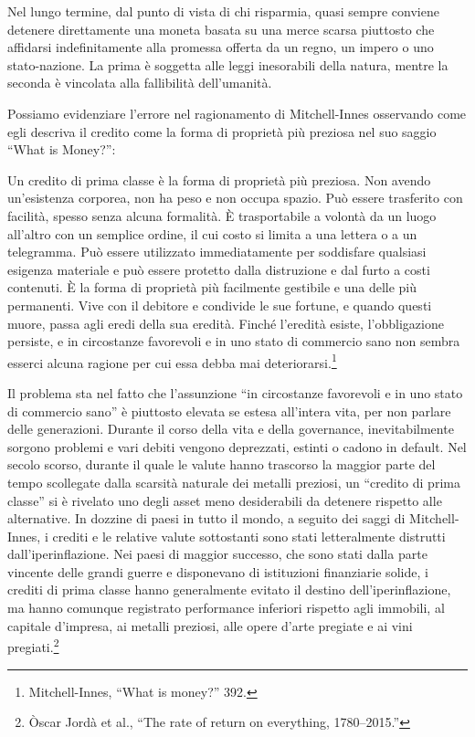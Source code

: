 \documentclass[
  a5paper,
  smalldemyvopaper,10pt,twoside,onecolumn,openright,extrafontsizes,hidelinks]{memoir}
\renewenvironment{quote}%
               {\list{}{\rightmargin=.6cm\leftmargin=.6cm}%
                \itshape \item[]}%
               {\endlist}
\begin{document}
Nel lungo termine, dal punto di vista di chi risparmia, quasi sempre
conviene detenere direttamente una moneta basata su una merce scarsa
piuttosto che affidarsi indefinitamente alla promessa offerta da un
regno, un impero o uno stato-nazione. La prima è soggetta alle leggi
inesorabili della natura, mentre la seconda è vincolata alla fallibilità
dell'umanità.

Possiamo evidenziare l'errore nel ragionamento di Mitchell-Innes
osservando come egli descriva il credito come la forma di proprietà più
preziosa nel suo saggio ``What is Money?'':

\begin{quote}
Un credito di prima classe è la forma di proprietà più preziosa. Non
avendo un'esistenza corporea, non ha peso e non occupa spazio. Può
essere trasferito con facilità, spesso senza alcuna formalità. È
trasportabile a volontà da un luogo all'altro con un semplice ordine, il
cui costo si limita a una lettera o a un telegramma. Può essere
utilizzato immediatamente per soddisfare qualsiasi esigenza materiale e
può essere protetto dalla distruzione e dal furto a costi contenuti. È
la forma di proprietà più facilmente gestibile e una delle più
permanenti. Vive con il debitore e condivide le sue fortune, e quando
questi muore, passa agli eredi della sua eredità. Finché l'eredità
esiste, l'obbligazione persiste, e in circostanze favorevoli e in uno
stato di commercio sano non sembra esserci alcuna ragione per cui essa
debba mai deteriorarsi.\footnote{Mitchell-Innes, ``What is money?'' 392.}
\end{quote}

Il problema sta nel fatto che l'assunzione ``in circostanze favorevoli e
in uno stato di commercio sano'' è piuttosto elevata se estesa
all'intera vita, per non parlare delle generazioni. Durante il corso
della vita e della governance, inevitabilmente sorgono problemi e vari
debiti vengono deprezzati, estinti o cadono in default. Nel secolo
scorso, durante il quale le valute hanno trascorso la maggior parte del
tempo scollegate dalla scarsità naturale dei metalli preziosi, un
``credito di prima classe'' si è rivelato uno degli asset meno
desiderabili da detenere rispetto alle alternative. In dozzine di paesi
in tutto il mondo, a seguito dei saggi di Mitchell-Innes, i crediti e le
relative valute sottostanti sono stati letteralmente distrutti
dall'iperinflazione. Nei paesi di maggior successo, che sono stati dalla
parte vincente delle grandi guerre e disponevano di istituzioni
finanziarie solide, i crediti di prima classe hanno generalmente evitato
il destino dell'iperinflazione, ma hanno comunque registrato performance
inferiori rispetto agli immobili, al capitale d'impresa, ai metalli
preziosi, alle opere d'arte pregiate e ai vini pregiati.\footnote{Òscar
  Jordà et al., ``The rate of return on everything, 1780--2015.''}
\end{document}
